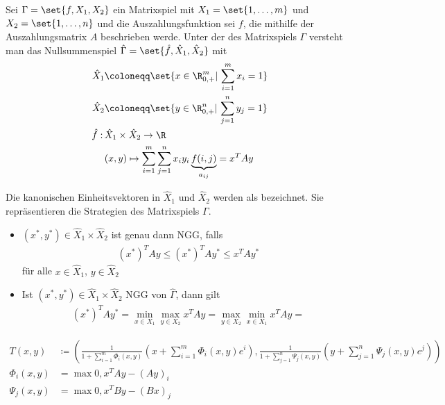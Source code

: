 \begin{definition*}
  Sei $\Gamma = \set{f, X_{1}, X_{2}}$ ein Matrixspiel mit $X_{1} = \set{1, \dots, m}$ und $X_{2} = \set{1, \dots, n}$ und die Auszahlungsfunktion sei $f$, die mithilfe der Auszahlungsmatrix $A$ beschrieben werde. Unter der  des Matrixspiels $\Gamma$ versteht man das Nullsummenspiel $\hat \Gamma = \set{\hat f, \hat X_{1}, \hat X_{2}}$ mit
  \begin{align*}
    \hat X_{1} &\coloneqq \set{x \in \R^{m}_{0, +} |\,\sum_{i = 1}^{m}x_{i} = 1}\\
    \hat X_{2} &\coloneqq \set{y \in \R^{n}_{0, +} |\,\sum_{j = 1}^{n}y_{j} = 1}\\
 \hat f:\, &\hat X_{1} \times \hat X_{2} \to \R \\
&(x, y) \mapsto \sum_{i = 1}^{m} \sum_{j = 1}^{n} x_{i}y_{i}\underbrace{f(i, j)}_{a_{ij}} = x^{T}Ay
  \end{align*}
\end{definition*}
\begin{bemerkung*}
  Die kanonischen Einheitsvektoren in $\hat X_{1}$ und $\hat X_{2}$ werden als  bezeichnet. Sie repräsentieren die Strategien des Matrixspiels $\Gamma$. 
\end{bemerkung*}
\begin{itemize}
\item $(x^{*}, y^{*}) \in \hat X_{1} \times \hat X_{2}$ ist genau dann NGG, falls
  \begin{align*}
    (x^{*})^{T} Ay \leq     (x^{*})^{T} Ay^{*} \leq     x^{T} Ay^{*}
  \end{align*}
für alle $x \in \hat X_{1}$, $y \in \hat X_{2}$
\item Ist $(x^{*}, y^{*}) \in \hat X_{1} \times \hat X_{2}$ NGG von $\hat \Gamma$, dann gilt
  \begin{align*}
    (x^{*})^{T} Ay^{*} = \min_{x \in X_{1}} \max_{y \in X_{2}} x^{T}A y =  \max_{y \in X_{2}} \min_{x \in X_{1}}x^{T}A y = 
  \end{align*}
\end{itemize}
\begin{align*}
  T(x, y) &\coloneqq \left( \frac 1 {1 + \sum_{i = 1}^{m}\Phi_{i}(x, y)}\left(x + \sum_{i = 1}^{m}\Phi_{i}(x, y)e^{i}\right), \frac 1 {1 + \sum_{j = 1}^{n}\Psi_{j}(x, y)}\left(y + \sum_{j = 1}^{n}\Psi_{j}(x, y)e^{j}\right)\right)\\
\Phi_{i} (x, y) &= \max {0, x^{T}Ay-(Ay)_{i}}\\
\Psi_{j} (x, y) &= \max {0, x^{T}By-(Bx)_{j}}
\end{align*}
